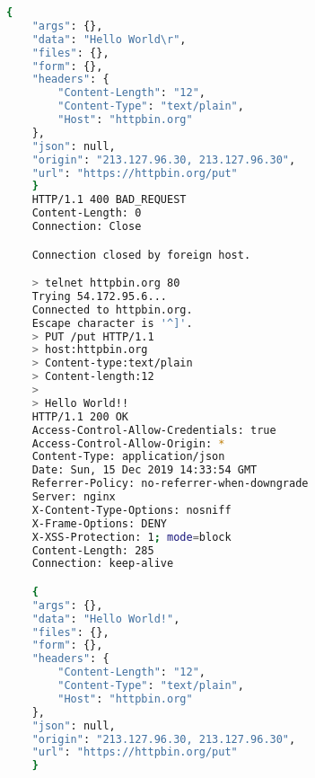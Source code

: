 \documentclass{article}
\begin{document}
\begin{lstlisting}[language=bash]
	{
	"args": {}, 
	"data": "Hello World\r", 
	"files": {}, 
	"form": {}, 
	"headers": {
		"Content-Length": "12", 
		"Content-Type": "text/plain", 
		"Host": "httpbin.org"
	}, 
	"json": null, 
	"origin": "213.127.96.30, 213.127.96.30", 
	"url": "https://httpbin.org/put"
	}
	HTTP/1.1 400 BAD_REQUEST
	Content-Length: 0
	Connection: Close

	Connection closed by foreign host.

	> telnet httpbin.org 80
	Trying 54.172.95.6...
	Connected to httpbin.org.
	Escape character is '^]'.
	> PUT /put HTTP/1.1
	> host:httpbin.org
	> Content-type:text/plain
	> Content-length:12
	> 
	> Hello World!!
	HTTP/1.1 200 OK
	Access-Control-Allow-Credentials: true
	Access-Control-Allow-Origin: *
	Content-Type: application/json
	Date: Sun, 15 Dec 2019 14:33:54 GMT
	Referrer-Policy: no-referrer-when-downgrade
	Server: nginx
	X-Content-Type-Options: nosniff
	X-Frame-Options: DENY
	X-XSS-Protection: 1; mode=block
	Content-Length: 285
	Connection: keep-alive

	{
	"args": {}, 
	"data": "Hello World!", 
	"files": {}, 
	"form": {}, 
	"headers": {
		"Content-Length": "12", 
		"Content-Type": "text/plain", 
		"Host": "httpbin.org"
	}, 
	"json": null, 
	"origin": "213.127.96.30, 213.127.96.30", 
	"url": "https://httpbin.org/put"
	}
	\end{lstlisting}

	\newpage
	\section{}

	
\end{document}
